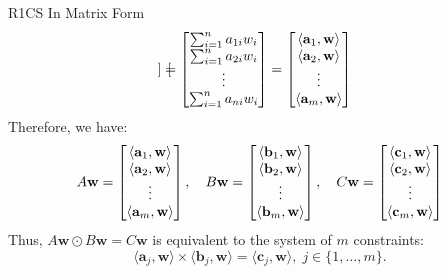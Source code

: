 \documentclass{zkdl-presentation-template}
\begin{document}
\begin{frame}{R1CS In Matrix Form}
{\begin{equation*}
\begin{bmatrix}
            \end{bmatrix} = \begin{bmatrix}
                \sum_{i=1}^{n}a_{1i}w_i \\ \sum_{i=1}^{n}a_{2i}w_i \\ \vdots \\ \sum_{i=1}^{n}a_{ni}w_i
            \end{bmatrix} = \begin{bmatrix}
                \langle \mathbf{a}_1, \mathbf{w}\rangle \\
                \langle \mathbf{a}_2, \mathbf{w}\rangle \\
                \vdots \\
                \langle \mathbf{a}_m, \mathbf{w}\rangle 
            \end{bmatrix}
            \vspace{-5pt}
        \end{equation*}}
        \pause
        Therefore, we have:
        \vspace{-5pt}
        {\scriptsize \begin{equation*}
            A\mathbf{w} = \begin{bmatrix}
                \langle \mathbf{a}_1, \mathbf{w}\rangle \\
                \langle \mathbf{a}_2, \mathbf{w}\rangle \\
                \vdots \\
                \langle \mathbf{a}_m, \mathbf{w}\rangle 
            \end{bmatrix}, \quad
            B\mathbf{w} = \begin{bmatrix}
                \langle \mathbf{b}_1, \mathbf{w}\rangle \\
                \langle \mathbf{b}_2, \mathbf{w}\rangle \\
                \vdots \\
                \langle \mathbf{b}_m, \mathbf{w}\rangle 
            \end{bmatrix}, \quad
            C\mathbf{w} = \begin{bmatrix}
                \langle \mathbf{c}_1, \mathbf{w}\rangle \\
                \langle \mathbf{c}_2, \mathbf{w}\rangle \\
                \vdots \\
                \langle \mathbf{c}_m, \mathbf{w}\rangle 
            \end{bmatrix}
            \vspace{-5pt}
        \end{equation*}}
        \pause
        Thus, {\small $A\mathbf{w} \odot B\mathbf{w} = C\mathbf{w}$} is equivalent to the system of $m$ constraints:
        \vspace{-5pt}
        {\small \begin{equation*}
            \langle \mathbf{a}_j, \mathbf{w}\rangle \times \langle \mathbf{b}_j, \mathbf{w} \rangle = \langle \mathbf{c}_j, \mathbf{w} \rangle, \; j \in \{1,\dots,m\}.
        \end{equation*}}
    \end{frame}
\end{document}
